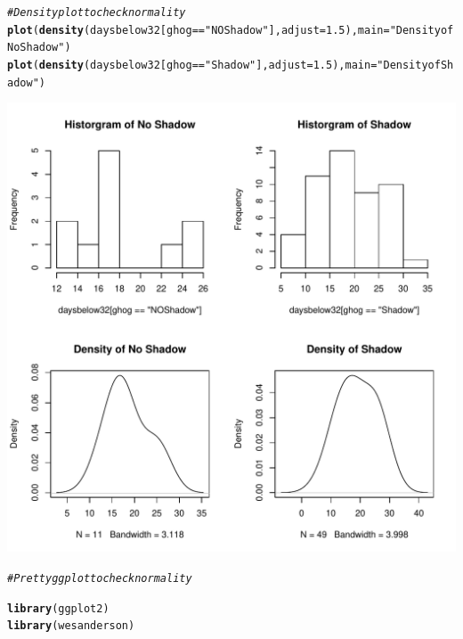\documentclass[12pt]{article}\usepackage[]{graphicx}\usepackage[]{color}
\makeatletter
\def\maxwidth{ %
  \ifdim\Gin@nat@width>\linewidth
    \linewidth
  \else
    \Gin@nat@width
  \fi
}
\newcommand{\hlnum}[1]{\textcolor[rgb]{0.686,0.059,0.569}{#1}}%
\newcommand{\hlstr}[1]{\textcolor[rgb]{0.192,0.494,0.8}{#1}}%
\newcommand{\hlcom}[1]{\textcolor[rgb]{0.678,0.584,0.686}{\textit{#1}}}%
\newcommand{\hlopt}[1]{\textcolor[rgb]{0,0,0}{#1}}%
\newcommand{\hlstd}[1]{\textcolor[rgb]{0.345,0.345,0.345}{#1}}%
\newcommand{\hlkwc}[1]{\textcolor[rgb]{0.333,0.667,0.333}{#1}}%
\newcommand{\hlkwd}[1]{\textcolor[rgb]{0.737,0.353,0.396}{\textbf{#1}}}%
\newenvironment{kframe}{%
 \def\at@end@of@kframe{}%
 \ifinner\ifhmode%
  \def\at@end@of@kframe{\end{minipage}}%
  \begin{minipage}{\columnwidth}%
 \fi\fi%
 \def\FrameCommand##1{\hskip\@totalleftmargin \hskip-\fboxsep
 \colorbox{shadecolor}{##1}\hskip-\fboxsep
     \hskip-\linewidth \hskip-\@totalleftmargin \hskip\columnwidth}%
 \MakeFramed {\advance\hsize-\width
   \@totalleftmargin\z@ \linewidth\hsize
   \@setminipage}}%
 {\par\unskip\endMakeFramed%
 \at@end@of@kframe}
\newenvironment{knitrout}{}{} %
\makeatother
\begin{document}
\begin{knitrout}
\begin{kframe}
\begin{alltt}
\hlcom{#Density plot to check normality}
\hlkwd{plot}\hlstd{(}\hlkwd{density}\hlstd{(daysbelow32[ghog}\hlopt{==}\hlstr{"NOShadow"}\hlstd{],}\hlkwc{adjust}\hlstd{=}\hlnum{1.5}\hlstd{),}\hlkwc{main}\hlstd{=}\hlstr{"Density of No Shadow"}\hlstd{)}
\hlkwd{plot}\hlstd{(}\hlkwd{density}\hlstd{(daysbelow32[ghog}\hlopt{==}\hlstr{"Shadow"}\hlstd{],}\hlkwc{adjust}\hlstd{=}\hlnum{1.5}\hlstd{),}\hlkwc{main}\hlstd{=}\hlstr{"Density of Shadow"}\hlstd{)}
\end{alltt}
\end{kframe}
\includegraphics[width=\maxwidth]{figure/plots-1} 
\begin{kframe}\begin{alltt}
\hlcom{# Pretty ggplot to check normality}

\hlkwd{library}\hlstd{(ggplot2)}
\hlkwd{library}\hlstd{(wesanderson)}


\end{alltt}
\end{kframe}
\end{knitrout}
\end{document}
